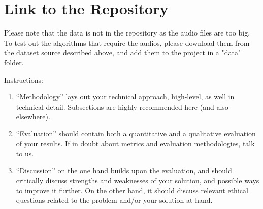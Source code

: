 \documentclass[11pt]{article}
\begin{document}
\section{Link to the Repository}

Please note that the data is not in the repository as the audio files are too big. To test out the algorithms that require the audios, please download them from the dataset source described above, and add them to the project in a "data" folder.

% 

%

Instructions: 
\begin{enumerate}


    \item ``Methodology'' lays out your technical approach, high-level, as well in technical detail. Subsections are highly recommended here (and also elsewhere).
    \item ``Evaluation'' should contain both a quantitative and a qualitative evaluation of your results. If in doubt about metrics and evaluation methodologies, talk to us.
    \item ``Discussion'' on the one hand builds upon the evaluation, and should critically discuss strengths and weaknesses of your solution, and possible ways to improve it further. On the other hand, it should discuss relevant ethical questions related to the problem and/or your solution at hand.
\end{enumerate}
\end{document}

